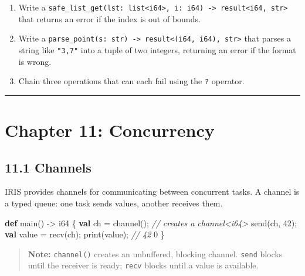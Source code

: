 \documentclass[
  english,
]{book}
\newenvironment{Shaded}{\begin{snugshade}}{\end{snugshade}}
\newcommand{\CommentTok}[1]{\textcolor[rgb]{0.42,0.60,0.33}{\textit{#1}}}
\newcommand{\DataTypeTok}[1]{\textcolor[rgb]{0.31,0.79,0.69}{#1}}
\newcommand{\DecValTok}[1]{\textcolor[rgb]{0.71,0.81,0.66}{#1}}
\newcommand{\FunctionTok}[1]{\textcolor[rgb]{0.86,0.86,0.67}{#1}}
\newcommand{\KeywordTok}[1]{\textcolor[rgb]{0.34,0.61,0.84}{\textbf{#1}}}
\newcommand{\NormalTok}[1]{\textcolor[rgb]{0.83,0.83,0.83}{#1}}
\newcommand{\OperatorTok}[1]{\textcolor[rgb]{0.83,0.83,0.83}{#1}}
\providecommand{\tightlist}{%
  \setlength{\itemsep}{0pt}\setlength{\parskip}{0pt}}
\begin{document}
\begin{enumerate}
\def\labelenumi{\arabic{enumi}.}
\tightlist
\item
  Write a
  \texttt{safe\_list\_get(lst:\ list\textless{}i64\textgreater{},\ i:\ i64)\ -\textgreater{}\ result\textless{}i64,\ str\textgreater{}}
  that returns an error if the index is out of bounds.
\item
  Write a
  \texttt{parse\_point(s:\ str)\ -\textgreater{}\ result\textless{}(i64,\ i64),\ str\textgreater{}}
  that parses a string like \texttt{"3,7"} into a tuple of two integers,
  returning an error if the format is wrong.
\item
  Chain three operations that can each fail using the \texttt{?}
  operator.
\end{enumerate}

\begin{center}\rule{0.5\linewidth}{0.5pt}\end{center}

\section{Chapter 11: Concurrency}\label{chapter-11-concurrency}

\subsection{11.1 Channels}\label{channels}

IRIS provides channels for communicating between concurrent tasks. A
channel is a typed queue: one task sends values, another receives them.

\begin{Shaded}
\begin{Highlighting}[]
\KeywordTok{def}\NormalTok{ main() }\OperatorTok{{-}\textgreater{}} \DataTypeTok{i64}\NormalTok{ \{}
    \KeywordTok{val}\NormalTok{ ch }\OperatorTok{=} \FunctionTok{channel}\NormalTok{();       }\CommentTok{// creates a channel\textless{}i64\textgreater{}}
    \FunctionTok{send}\NormalTok{(ch, }\DecValTok{42}\NormalTok{);}
    \KeywordTok{val}\NormalTok{ value }\OperatorTok{=} \FunctionTok{recv}\NormalTok{(ch);}
    \FunctionTok{print}\NormalTok{(value);             }\CommentTok{// 42}
    \DecValTok{0}
\NormalTok{\}}
\end{Highlighting}
\end{Shaded}

\begin{quote}
\textbf{Note:} \texttt{channel()} creates an unbuffered, blocking
channel. \texttt{send} blocks until the receiver is ready; \texttt{recv}
blocks until a value is available.
\end{quote}
\end{document}
